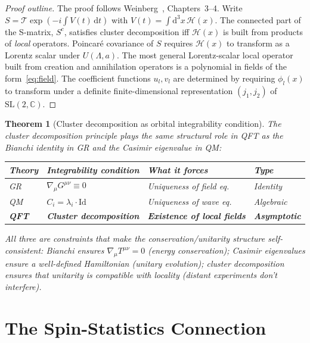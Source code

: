 \documentclass[12pt]{article}
\theoremstyle{plain}
\newtheorem{theorem}{Theorem}[section]
\theoremstyle{definition}
\theoremstyle{remark}
\newcommand{\SL}{\mathrm{SL}}
\newcommand{\dd}{\mathrm{d}}
\begin{document}
\begin{proof}[Proof outline]
The proof follows Weinberg~\cite{weinberg1995}, Chapters~3--4. Write $S = \mathcal{T}\exp(-i\int V(t)\,\dd t)$ with $V(t) = \int \dd^3x\,\mathcal{H}(x)$. The connected part of the S-matrix, $S^c$, satisfies cluster decomposition iff $\mathcal{H}(x)$ is built from products of \emph{local} operators. Poincar\'e covariance of $S$ requires $\mathcal{H}(x)$ to transform as a Lorentz scalar under $U(\Lambda, a)$. The most general Lorentz-scalar local operator built from creation and annihilation operators is a polynomial in fields of the form~\eqref{eq:field}. The coefficient functions $u_l, v_l$ are determined by requiring $\phi_l(x)$ to transform under a definite finite-dimensional representation $(j_1, j_2)$ of $\SL(2, \mathbb{C})$.
\end{proof}

\begin{theorem}[Cluster decomposition as orbital integrability condition]\label{thm:cluster-integrability}
The cluster decomposition principle plays the same structural role in QFT as the Bianchi identity in GR and the Casimir eigenvalue in QM:

\begin{center}\small
\begin{tabular}{llll}\toprule
\textbf{Theory} & \textbf{Integrability condition} & \textbf{What it forces} & \textbf{Type} \\\midrule
GR & $\nabla_\mu G^{\mu\nu} \equiv 0$ & Uniqueness of field eq. & Identity \\
QM & $C_i = \lambda_i \cdot \mathrm{Id}$ & Uniqueness of wave eq. & Algebraic \\
\textbf{QFT} & \textbf{Cluster decomposition} & \textbf{Existence of local fields} & \textbf{Asymptotic} \\
\bottomrule
\end{tabular}
\end{center}

All three are constraints that make the conservation/unitarity structure self-consistent: Bianchi ensures $\nabla_\mu T^{\mu\nu} = 0$ (energy conservation); Casimir eigenvalues ensure a well-defined Hamiltonian (unitary evolution); cluster decomposition ensures that unitarity is compatible with locality (distant experiments don't interfere).
\end{theorem}


\section{The Spin-Statistics Connection}
\label{sec:spinstat}
\end{document}
